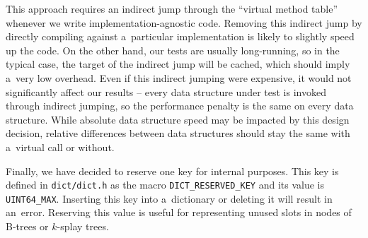 This approach requires an indirect jump through the ``virtual method table''
whenever we write implementation-agnostic code. Removing this indirect jump
by directly compiling against a~particular implementation is likely to slightly
speed up the code. On the other hand, our tests are usually long-running, so in
the typical case, the target of the indirect jump will be cached, which should
imply a~very low overhead. Even if this indirect jumping were expensive, it
would not significantly affect our results -- every data structure under test
is invoked through indirect jumping, so the performance penalty is the same
on every data structure. While absolute data structure speed may be impacted
by this design decision, relative differences between data structures should
stay the same with a~virtual call or without.

Finally, we have decided to reserve one key for internal purposes.
This key is defined in \texttt{dict/dict.h} as the macro
\texttt{DICT\_RESERVED\_KEY} and its value is \texttt{UINT64\_MAX}.
Inserting this key into a~dictionary or deleting it will result in an~error.
Reserving this value is useful for representing unused slots in nodes of
\mbox{B-trees} or $k$-splay trees.

